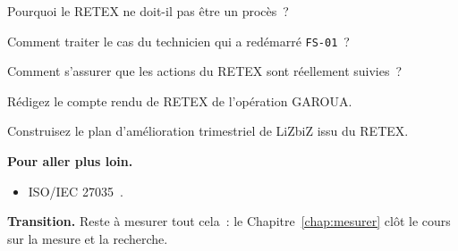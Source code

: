 \begin{boxexo}[title={\ding{45}\quad Exercice~19.6. Sans procès \niveaumoyen}]
Pourquoi le RETEX ne doit-il pas être un procès~?
\end{boxexo}

\begin{boxexo}[title={\ding{45}\quad Exercice~19.7. Le technicien \niveaumoyen}]
Comment traiter le cas du technicien qui a redémarré \texttt{FS-01}~?
\end{boxexo}

\begin{boxexo}[title={\ding{45}\quad Exercice~19.8. Suivi \niveaumoyen}]
Comment s'assurer que les actions du RETEX sont réellement suivies~?
\end{boxexo}

\begin{boxexo}[title={\ding{45}\quad Exercice~19.9. Compte rendu de RETEX \niveauexpert}]
Rédigez le compte rendu de RETEX de l'opération GAROUA.
\end{boxexo}

\begin{boxexo}[title={\ding{45}\quad Exercice~19.10. Plan d'amélioration \niveauexpert}]
Construisez le plan d'amélioration trimestriel de LiZbiZ issu du RETEX.
\end{boxexo}

\bigskip

\begin{boxinfo}
\textbf{Pour aller plus loin.}
\begin{itemize}
    \item ISO/IEC 27035~\cite{iso27035}.
\end{itemize}
\end{boxinfo}

\begin{boxinfo}
\textbf{Transition.} Reste à mesurer tout cela~: le
Chapitre~\ref{chap:mesurer} clôt le cours sur la mesure et la recherche.
\end{boxinfo}
